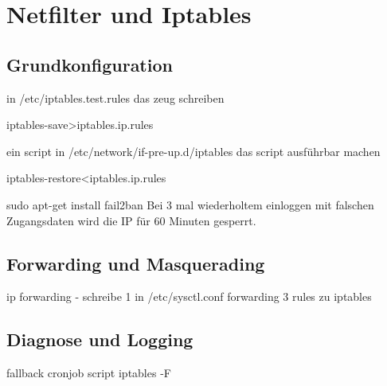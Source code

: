 \chapter{Netfilter und Iptables}
\section{Grundkonfiguration}
in /etc/iptables.test.rules das zeug schreiben

iptables-save>iptables.ip.rules

ein script in /etc/network/if-pre-up.d/iptables
das script ausführbar machen

iptables-restore<iptables.ip.rules

sudo apt-get install fail2ban
Bei 3 mal wiederholtem einloggen mit falschen Zugangsdaten wird die IP für 60 Minuten gesperrt.

\section{Forwarding und Masquerading}
ip  forwarding - schreibe 1 in /etc/sysctl.conf forwarding
3 rules zu iptables

\section{Diagnose und Logging}
fallback cronjob script iptables -F
